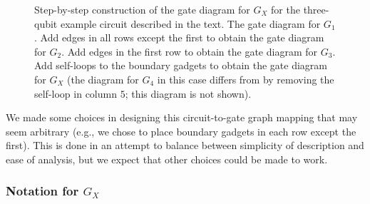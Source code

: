 \documentclass[../thesis-main/thesis-main]{subfiles}
\begin{document}

\begin{figure}
\centering {} 




\caption[Step-by-step construction of $G_X$]{Step-by-step construction of the gate diagram for $G_X$ for the three-qubit example circuit described in the text. 
 The gate diagram for $G_{1}$.
 Add edges in all rows except the first to obtain the gate diagram for $G_{2}$.
 Add edges in the first row to obtain the gate diagram for $G_{3}$.
 Add self-loops to the boundary gadgets to obtain the gate diagram for $G_X$ (the diagram for $G_{4}$ in this case differs from  by removing the self-loop in column $5$; this diagram is not shown).
\label{fig:step-by-step}
}
\end{figure}

We made some choices in designing this circuit-to-gate graph mapping that may seem arbitrary (e.g., we chose to place boundary gadgets in each row except the first). This is done in an attempt to balance between simplicity of description and ease of analysis, but we expect that other choices could be made to work.

\subsubsection{Notation for $G_X$}
\end{document}
